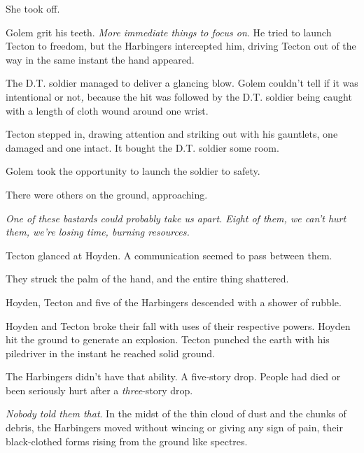 She took off.



Golem grit his teeth.  \emph{More immediate things to focus on}.  He tried to launch Tecton to freedom, but the Harbingers intercepted him, driving Tecton out of the way in the same instant the hand appeared.



The D.T. soldier managed to deliver a glancing blow.  Golem couldn't tell if it was intentional or not\emph{, }because the hit was followed by the D.T. soldier being caught with a length of cloth wound around one wrist.



Tecton stepped in, drawing attention and striking out with his gauntlets, one damaged and one intact.  It bought the D.T. soldier some room.



Golem took the opportunity to launch the soldier to safety.



There were others on the ground, approaching.



\emph{One of these bastards could probably take us apart.  Eight of them, we can't hurt them, we're losing time, burning resources.}



Tecton glanced at Hoyden.  A communication seemed to pass between them.



They struck the palm of the hand, and the entire thing shattered.



Hoyden, Tecton and five of the Harbingers descended with a shower of rubble.



Hoyden and Tecton broke their fall with uses of their respective powers.  Hoyden hit the ground to generate an explosion.  Tecton punched the earth with his piledriver in the instant he reached solid ground.



The Harbingers didn't have that ability.  A five-story drop.  People had died or been seriously hurt after a \emph{three}-story drop.



\emph{Nobody told them that}.  In the midst of the thin cloud of dust and the chunks of debris, the Harbingers moved without wincing or giving any sign of pain, their black-clothed forms rising from the ground like spectres.



